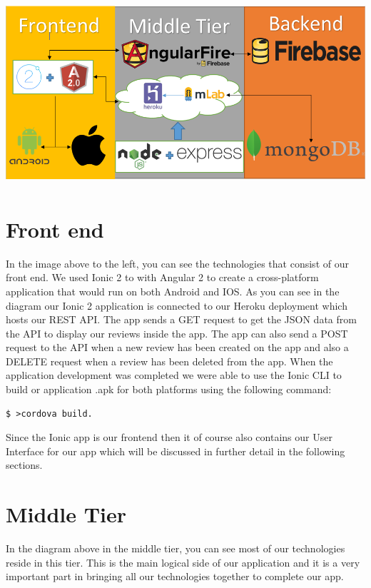 \begin{center}    
	\includegraphics[width=15cm, height=6.8cm]{img/system.png}
\end{center}

\section{Front end}
In the image above to the left, you can see the technologies that consist of our front end. We used Ionic 2 to with Angular 2 to create a cross-platform application that would run on both Android and IOS. As you can see in the diagram our Ionic 2 application is connected to our Heroku deployment which hosts our REST API. The app sends a GET request to get the JSON data from the API to display our reviews inside the app. The app can also send a POST request to the API when a new review has been created on the app and also a DELETE request when a review has been deleted from the app. When the application development was completed we were able to use the Ionic CLI to build or application .apk for both platforms using the following command:

\begin{verbatim}
$ >cordova build.
\end{verbatim}
Since the Ionic app is our frontend then it of course also contains our User Interface for our app which will be discussed in further detail in the following sections.

\section{Middle Tier}
In the diagram above in the middle tier, you can see most of our technologies reside in this tier. This is the main logical side of our application and it is a very important part in bringing all our technologies together to complete our app.


